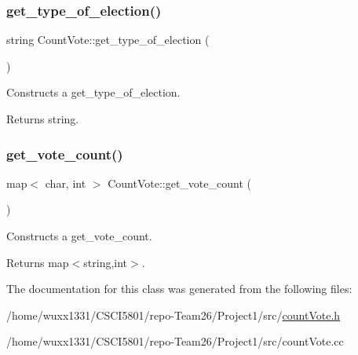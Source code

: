 \subsubsection{\texorpdfstring{get\+\_\+type\+\_\+of\+\_\+election()}{get\_type\_of\_election()}}
{\footnotesize\ttfamily string Count\+Vote\+::get\+\_\+type\+\_\+of\+\_\+election (\begin{DoxyParamCaption}{ }\end{DoxyParamCaption})}



Constructs a get\+\_\+type\+\_\+of\+\_\+election. 

\begin{DoxyReturn}{Returns}
string. 
\end{DoxyReturn}
\mbox{\label{classCountVote_a673eb4f6f6c35ea833ecaef84904acac}} 
\subsubsection{\texorpdfstring{get\+\_\+vote\+\_\+count()}{get\_vote\_count()}}
{\footnotesize\ttfamily map$<$ char, int $>$ Count\+Vote\+::get\+\_\+vote\+\_\+count (\begin{DoxyParamCaption}{ }\end{DoxyParamCaption})}



Constructs a get\+\_\+vote\+\_\+count. 

\begin{DoxyReturn}{Returns}
map$<$string,int$>$. 
\end{DoxyReturn}


The documentation for this class was generated from the following files\+:\begin{DoxyCompactItemize}
\item 
/home/wuxx1331/\+C\+S\+C\+I5801/repo-\/\+Team26/\+Project1/src/\hyperlink{countVote_8h}{count\+Vote.\+h}\item 
/home/wuxx1331/\+C\+S\+C\+I5801/repo-\/\+Team26/\+Project1/src/count\+Vote.\+cc\end{DoxyCompactItemize}
